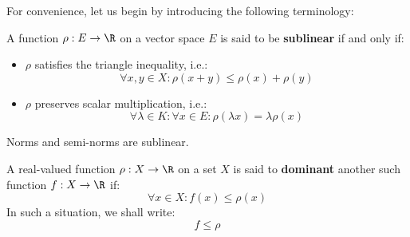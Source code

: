         For convenience, let us begin by introducing the following terminology:
        \begin{definition}[Sublinearity] \label{def: sublinearity}
            A function $\rho: E \to \R$ on a vector space $E$ is said to be \textbf{sublinear} if and only if:
            \begin{itemize}
                \item $\rho$ satisfies the triangle inequality, i.e.:
                    $$\forall x, y \in X: \rho(x + y) \leq \rho(x) + \rho(y)$$
                \item $\rho$ preserves scalar multiplication, i.e.:
                    $$\forall \lambda \in K: \forall x \in E: \rho(\lambda x) = \lambda \rho(x)$$
            \end{itemize}
        \end{definition}
        \begin{example}
            Norms and semi-norms are sublinear. 
        \end{example}
        \begin{definition}[Dominance] \label{def: dominance}
            A real-valued function $\rho: X \to \R$ on a set $X$ is said to \textbf{dominant} another such function $f: X \to \R$ if:
                $$\forall x \in X: f(x) \leq \rho(x)$$
            In such a situation, we shall write:
                $$f \leq \rho$$
        \end{definition}

